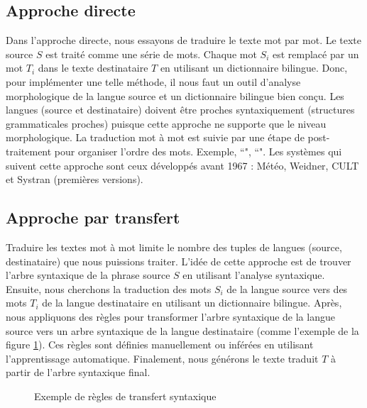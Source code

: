 \documentclass{KodeBook}
\begin{document}
\subsection{Approche directe}

Dans l'approche directe, nous essayons de traduire le texte mot par mot. 
Le texte source $S$ est traité comme une série de mots. 
Chaque mot $S_i$ est remplacé par un mot $T_i$ dans le texte destinataire $T$ en utilisant un dictionnaire bilingue. 
Donc, pour implémenter une telle méthode, il nous faut un outil d'analyse morphologique de la langue source et un dictionnaire bilingue bien conçu. 
Les langues (source et destinataire) doivent être proches syntaxiquement (structures grammaticales proches) puisque cette approche ne supporte que le niveau morphologique. 
La traduction mot à mot est suivie par une étape de post-traitement pour organiser l'ordre des mots. 
Exemple, ``", ``".
Les systèmes qui suivent cette approche sont ceux développés avant 1967 : Météo, Weidner, CULT et Systran (premières versions).

\subsection{Approche par transfert}

Traduire les textes mot à mot limite le nombre des tuples de langues (source, destinataire) que nous puissions traiter. 
L'idée de cette approche est de trouver l'arbre syntaxique de la phrase source $S$ en utilisant l'analyse syntaxique. 
Ensuite, nous cherchons la traduction des mots $S_i$ de la langue source vers des mots $T_i$ de la langue destinataire en utilisant un dictionnaire bilingue.
Après, nous appliquons des règles pour transformer l'arbre syntaxique de la langue source vers un arbre syntaxique de la langue destinataire (comme l'exemple de la figure \ref{fig:mt-transfert-exp}).
Ces règles sont définies manuellement ou inférées en utilisant l'apprentissage automatique.
Finalement, nous générons le texte traduit $T$ à partir de l'arbre syntaxique final.

\begin{figure}[!ht]
	\centering
	\caption[Exemple de règles de transfert syntaxique]{Exemple de règles de transfert syntaxique \cite{06-quah}}
	\label{fig:mt-transfert-exp}
\end{figure}
\end{document}
